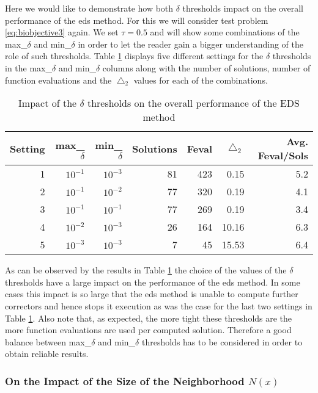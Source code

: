 Here we would like to demonstrate how both $\delta$ thresholds impact on the overall performance of the \gls{eds} method. For this we will consider test problem \eqref{eq:biobjective3} again. We set $\tau = 0.5$ and will show some combinations of the max\_$\delta$ and min\_$\delta$ in order to let the reader gain a bigger understanding of the role of such thresholds. Table \ref{table:sols_different_deltas} displays five different settings for the $\delta$ thresholds in the max\_$\delta$ and min\_$\delta$ columns along with the number of solutions, number of function evaluations and the $\bigtriangleup_2$ values for each of the combinations.

\begin{table}[H]
\centering
\begin{adjustbox}{max width=\textwidth}
\begin{tabular}{| r  r  r  r  r  r  r |}
	\hline
	Setting & max\_$\delta$ & min\_$\delta$ & Solutions & Feval & $\bigtriangleup_2$ & Avg. Feval/Sols\\  
  	\hline
	1 & $10^{-1}$ & $10^{-3}$ & 81 & 423 & 0.15 & 5.2\\
	2 & $10^{-1}$ & $10^{-2}$ & 77 & 320 & 0.19 & 4.1\\
	3 & $10^{-1}$ & $10^{-1}$ & 77 & 269 & 0.19 & 3.4\\
	4 & $10^{-2}$ & $10^{-3}$ & 26 & 164 & 10.16 & 6.3\\
	5 & $10^{-3}$ & $10^{-3}$ & 7 & 45 & 15.53 & 6.4\\
  	\hline
\end{tabular}
\end{adjustbox}
\caption{Impact of the $\delta$ thresholds on the overall performance of the EDS method}
\label{table:sols_different_deltas}
\end{table}

As can be observed by the results in Table \ref{table:sols_different_deltas} the choice of the values of the $\delta$ thresholds have a large impact on the performance of the \gls{eds} method. In some cases this impact is so large that the \gls{eds} method is unable to compute further correctors and hence stops it execution as was the case for the last two settings in Table \ref{table:sols_different_deltas}. Also note that, as expected, the more tight these thresholds are the more function evaluations are used per computed solution. Therefore a good balance between max\_$\delta$ and min\_$\delta$ thresholds has to be considered in order to obtain reliable results.

\subsubsection{On the Impact of the Size of the Neighborhood $N(x)$}

